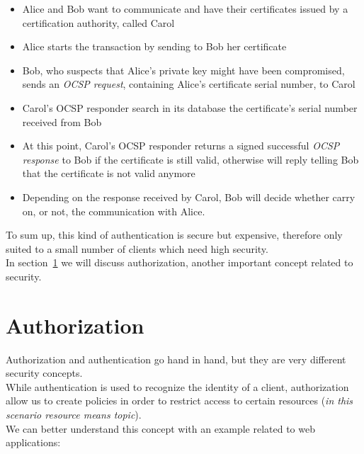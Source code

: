 \documentclass[12pt]{report}
\begin{document}
{{\begin{itemize}
\begin{itemize}
\begin{enumerate}
\begin{itemize}
\item Alice and Bob want to communicate and have their certificates issued by a certification authority, called Carol
\item Alice starts the transaction by sending to Bob her certificate
\item Bob, who suspects that Alice's private key might have been compromised, sends an \emph{OCSP request}, containing Alice's certificate serial number, to Carol
\item Carol's OCSP responder search in its database the certificate's serial number received from Bob
\item At this point, Carol's OCSP responder returns a signed successful \emph{OCSP response} to Bob if the certificate is still valid, otherwise will reply telling Bob that the certificate is not valid anymore
\item Depending on the response received by Carol, Bob will decide whether carry on, or not, the communication with Alice.\\
\end{itemize}


\end{enumerate}
\end{itemize}
\end{itemize}


To sum up, this kind of authentication is secure but expensive, therefore only suited to a small number of clients which need high security. \\

In section~\ref{sec:mqttauth} we will discuss authorization, another important concept related to security.\\


\section{Authorization}
\label{sec:mqttauth}
\bigskip
Authorization and authentication go hand in hand, but they are very different security concepts.\\
While authentication is used to recognize the identity of a client, authorization allow us to create policies in order to restrict access to certain resources (\emph{in this scenario resource means topic}).\\
We can better understand this concept with an example related to web applications:\\

}}
\end{document}
